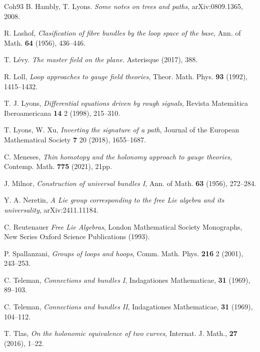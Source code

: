 \documentclass{amsart}
\begin{document}
\begin{thebibliography}{Coh93}
  B. Hambly, T. Lyons. \emph{Some notes on trees and paths}, arXiv:0809.1365, 2008.

R. Lashof, \emph{Clasification of fibre bundles by the loop space of the base}, Ann. of Math. \textbf{64} (1956), 436--446.

 T. L\'evy. \emph{The master field on the plane.} Asterisque (2017), 388.




R. Loll, \emph{Loop approaches to gauge field theories}, Theor. Math. Phys. \textbf{93} (1992), 1415--1432.

T. J. Lyons, \emph{Differential equations driven by rough signals}, Revista Matemática Iberoamericana \textbf{14} 2 (1998), 215--310.


T. Lyons, W. Xu, \emph{Inverting the signature of a path}, Journal of the European Mathematical Society \textbf{7} 20 (2018), 1655--1687.


C. Meneses, \emph{Thin homotopy and the holonomy approach to gauge theories}, Contemp. Math. \textbf{775} (2021), 21pp.


J. Milnor, \emph{Construction of universal bundles I}, Ann. of Math. \textbf{63} (1956), 272--284.




Y. A. Neretin, \emph{A Lie group corresponding to the free Lie algebra and its universality}, arXiv:2411.11184.


C. Reutenauer \emph{Free Lie Algebras},  London Mathematical Society Monographs, New Series  Oxford Science Publications (1993). 

P. Spallanzani, \emph{Groups of loops and hoops}, Comm. Math. Phys. \textbf{216} 2 (2001), 243--253.


C. Teleman, \emph{Connections and bundles I}, Indagationes Mathematicae, \textbf{31} (1969), 89--103.

C. Teleman, \emph{Connections and bundles II}, Indagationes Mathematicae, \textbf{31} (1969), 104--112.

T. Tlas, \emph{On the holonomic equivalence of two curves}, Internat. J. Math., \textbf{27} (2016), 1--22.




\end{thebibliography}
\end{document}

